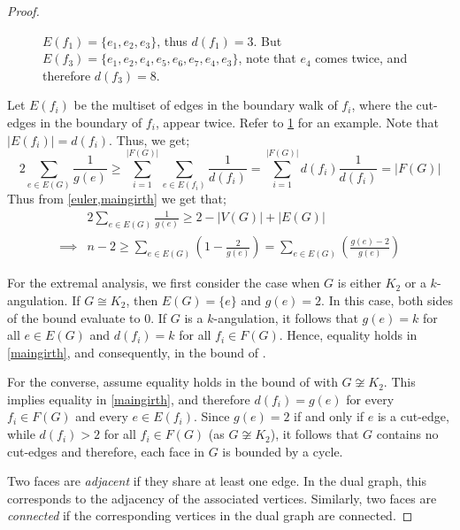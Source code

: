 \documentclass[pdflatex,sn-basic,Numbered]{sn-jnl}
\begin{document}
\begin{proof}
\begin{figure}[htb]
\begin{tikzpicture}[
        V/.style={circle, fill=black, inner sep=1.5pt},
        E/.style={draw, thin},
        font=\small
    ]
    \end{tikzpicture}
    
    \caption{$E(f_1) = \{e_1,e_2,e_3\}$, thus $d(f_1) = 3$. But $E(f_3) = \{e_1,e_2,e_4,e_5,e_6,e_7,e_4,e_3\}$, note that $e_4$ comes twice, and therefore $d(f_3) = 8$.}
    \label{fig:ex} 
\end{figure}



Let $E(f_i)$ be the multiset of edges in the boundary walk of $f_i$, where the cut-edges in the boundary of $f_i$, appear twice. Refer to \cref{fig:ex} for an example. Note that $|E(f_i)| = d(f_i)$. Thus, we get;
\begin{equation}\label{maingirth}
    2 \sum_{e \in E(G)}\frac{1}{g(e)} \geq \sum_{i =1}^{|F(G)|}\sum_{e \in E(f_i)}\frac{1}{d(f_i)} = \sum_{i=1}^{|F(G)|}d(f_i)\frac{1}{d(f_i)} = |F(G)|
\end{equation}
 Thus from \cref{euler,maingirth} we get that;
 \begin{align*}
     &2\sum_{e\in E(G)}\frac{1}{g(e)} \geq 2 - |V(G)| + |E(G)|\\
     \implies &n -2 \geq \sum_{e \in E(G)}\left(1-\frac{2}{g(e)}\right) = \sum_{e \in E(G)}\left(\frac{g(e)-2}{g(e)}\right)
 \end{align*}

For the extremal analysis, we first consider the case when $G$ is either $K_{2}$ or a $k$-angulation. 
If $G \cong K_{2}$, then $E(G) = \{e\}$ and $g(e)=2$. In this case, both sides of the bound evaluate to $0$. 
If $G$ is a $k$-angulation, it follows that $g(e) = k$ for all $e \in E(G)$ and $d(f_i) = k$ for all $f_i \in F(G)$. 
Hence, equality holds in \cref{maingirth}, and consequently, in the bound of .  

For the converse, assume equality holds in the bound of  with $G \not\cong K_{2}$. 
This implies equality in \cref{maingirth}, and therefore $d(f_i) = g(e)$ for every $f_i \in F(G)$ and every $e \in E(f_i)$. 
Since $g(e) = 2$ if and only if $e$ is a cut-edge, while $d(f_i) > 2$ for all $f_i \in F(G)$ (as $G \not\cong K_{2}$), it follows that $G$ contains no cut-edges and therefore, each face in $G$ is bounded by a cycle.

Two faces are \emph{adjacent} if they share at least one edge. In the dual graph, this corresponds to the adjacency of the associated vertices. Similarly, two faces are \emph{connected} if the corresponding vertices in the dual graph are connected. 


\end{proof}
\end{document}
